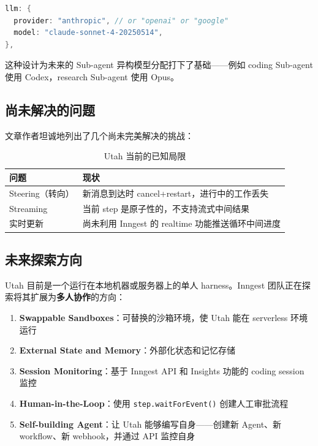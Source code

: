 \documentclass[a4paper]{article}
\begin{document}
\begin{lstlisting}[caption={LLM Provider 配置},language=Java]
llm: {
  provider: "anthropic", // or "openai" or "google"
  model: "claude-sonnet-4-20250514",
},
\end{lstlisting}

这种设计为未来的 Sub-agent 异构模型分配打下了基础——例如 coding Sub-agent 使用 Codex，research Sub-agent 使用 Opus。

\subsection{尚未解决的问题}

文章作者坦诚地列出了几个尚未完美解决的挑战：

\begin{table}[H]
\centering
\caption{Utah 当前的已知局限}
\begin{tabular}{lp{9cm}}
\toprule
\textbf{问题} & \textbf{现状} \\
\midrule
Steering（转向） & 新消息到达时 cancel+restart，进行中的工作丢失 \\
Streaming & 当前 step 是原子性的，不支持流式中间结果 \\
实时更新 & 尚未利用 Inngest 的 realtime 功能推送循环中间进度 \\
\bottomrule
\end{tabular}
\end{table}

\subsection{未来探索方向}

Utah 目前是一个运行在本地机器或服务器上的单人 harness。Inngest 团队正在探索将其扩展为\textbf{多人协作}的方向：

\begin{enumerate}
    \item \textbf{Swappable Sandboxes}：可替换的沙箱环境，使 Utah 能在 serverless 环境运行
    \item \textbf{External State and Memory}：外部化状态和记忆存储
    \item \textbf{Session Monitoring}：基于 Inngest API 和 Insights 功能的 coding session 监控
    \item \textbf{Human-in-the-Loop}：使用 \texttt{step.waitForEvent()} 创建人工审批流程
    \item \textbf{Self-building Agent}：让 Utah 能够编写自身——创建新 Agent、新 workflow、新 webhook，并通过 API 监控自身
\end{enumerate}
\end{document}
